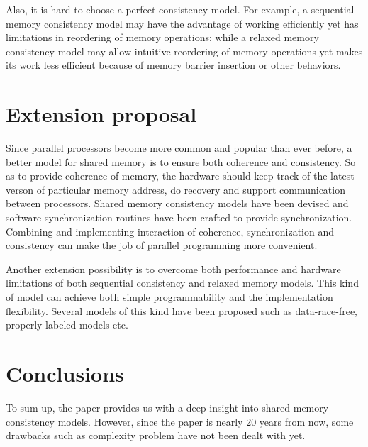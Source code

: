 \documentclass[10pt, letterpaper]{article}
\begin{document}
Also, it is
hard to choose a perfect consistency model. For example, a sequential memory consistency model may have the
advantage of working efficiently yet has limitations in reordering of memory operations; while a relaxed memory
consistency model may allow intuitive reordering of memory operations yet makes its work less efficient because
of memory barrier insertion or other behaviors\cite{blundell2006subtleties}. 

\section{Extension proposal}
Since parallel processors become more common and popular than ever before, a better model for shared memory is
to ensure both coherence and consistency. So as to provide coherence of memory, the hardware should keep track
of the latest verson of particular memory address, do recovery and support communication between processors.
Shared memory consistency models have been devised and software synchronization routines have been crafted to
provide synchronization. Combining and implementing interaction of coherence, synchronization and consistency
can make the job of parallel programming more convenient.\cite{hammond2004transactional} 

Another extension possibility is to overcome both performance and hardware limitations of both sequential
consistency and relaxed memory models. This kind of model can achieve both simple programmability and the
implementation flexibility. Several models of this kind have been proposed such as data-race-free, properly
labeled models etc.\cite{boehm2008foundations}
\section{Conclusions}
To sum up, the paper provides us with a deep insight into shared
memory consistency models. However, since the paper is nearly 20 years from
now, some drawbacks such as complexity problem have not been dealt with yet.



\end{document}
